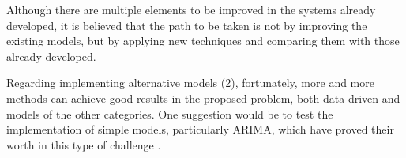 Although there are multiple elements to be improved in the systems already developed, it is believed that the path to be taken is not by improving the existing models, but by applying new techniques and comparing them with those already developed. 

Regarding implementing alternative models (2), fortunately, more and more methods can achieve good results in the proposed problem, both data-driven and models of the other categories. One suggestion would be to test the implementation of simple models, particularly \ac{ARIMA}, which have proved their worth in this type of challenge \cite{arimafuture}.